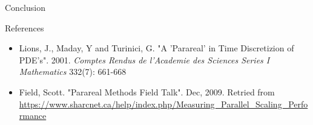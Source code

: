 \documentclass[final]{beamer}
\newlength{\onecolwid}
\begin{document}
\begin{frame}[t]
\begin{columns}[t]
\begin{column}{\onecolwid}
\begin{alertblock}{Conclusion}
\end{alertblock}



\begin{block}{References}

\begin{itemize}
\item Lions, J., Maday, Y and Turinici, G. "A 'Parareal' in Time Discretizion of PDE's". 2001. \textit{Comptes Rendus de l'Academie des Sciences Series I Mathematics} 332(7): 661-668\\

\item Field, Scott. "Parareal Methods Field Talk". Dec, 2009. Retried from \url{https://www.sharcnet.ca/help/index.php/Measuring_Parallel_Scaling_Performance}

\end{itemize}


\end{block}


\end{column} %

\end{columns} %

\end{frame} %
\end{document}
